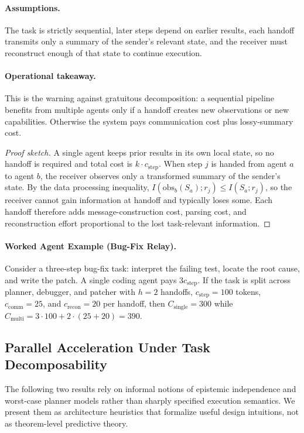 \paragraph{Assumptions.}
The task is strictly sequential, later steps depend on earlier results, each handoff transmits only a
summary of the sender's relevant state, and the receiver must reconstruct enough of that state to
continue execution.

\paragraph{Operational takeaway.}
This is the warning against gratuitous decomposition: a sequential pipeline benefits from multiple agents
only if a handoff creates new observations or new capabilities. Otherwise the system pays communication
cost plus lossy-summary cost.

\begin{proof}[Proof sketch]
A single agent keeps prior results in its own local state, so no handoff is required and total cost is
$k \cdot c_{\mathrm{step}}$. When step $j$ is handed from agent $a$ to agent $b$, the receiver observes
only a transformed summary of the sender's state. By the data processing inequality,
$I(\mathrm{obs}_b(S_a); r_j) \le I(S_a; r_j)$, so the receiver cannot gain information at handoff and
typically loses some. Each handoff therefore adds message-construction cost, parsing cost, and
reconstruction effort proportional to the lost task-relevant information.
\end{proof}

\paragraph{Worked Agent Example (Bug-Fix Relay).}
Consider a three-step bug-fix task: interpret the failing test, locate the root cause, and write the
patch. A single coding agent pays $3c_{\mathrm{step}}$. If the task is split across planner, debugger,
and patcher with $h=2$ handoffs, $c_{\mathrm{step}}=100$ tokens, $c_{\mathrm{comm}}=25$, and
$c_{\mathrm{recon}}=20$ per handoff, then $C_{\mathrm{single}}=300$ while
$C_{\mathrm{multi}}=3\cdot100+2\cdot(25+20)=390$.

\subsection{Parallel Acceleration Under Task Decomposability}

\medskip
\noindent
The following two results rely on informal notions of epistemic independence
and worst-case planner models rather than sharply specified execution
semantics.  We present them as architecture heuristics that formalize useful
design intuitions, not as theorem-level predictive theory.
\medskip

